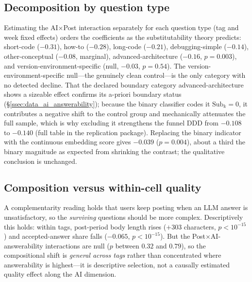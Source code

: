 \label{sec:mechanisms_body}

\subsection{Decomposition by question type}\label{ssec:mech_by_type}\label{ssec:mech_qtype_anomaly}

Estimating the AI$\times$Post interaction separately for each
question type (tag and week fixed effects) orders the
coefficients as the substitutability theory predicts:
short-code ($-0.31$), how-to ($-0.28$), long-code ($-0.21$),
debugging-simple ($-0.14$), other-conceptual ($-0.08$,
marginal), advanced-architecture ($-0.16$, $p=0.003$), and
version-environment-specific (null, $-0.03$, $p=0.54$). The
version-environment-specific null---the genuinely clean
control---is the only category with no detected decline. That
the declared boundary category advanced-architecture shows a
sizeable effect confirms its a-priori boundary status
(\S\ref{ssec:data_ai_answerability}); because the binary
classifier codes it $\text{Sub}_k=0$, it contributes a negative
shift to the control group and mechanically attenuates the full
sample, which is why excluding it strengthens the funnel DDD
from $-0.108$ to $-0.140$ (full table in the replication
package). Replacing the binary indicator with the continuous
embedding score gives $-0.039$ ($p=0.004$), about a third the
binary magnitude as expected from shrinking the contrast; the
qualitative conclusion is unchanged.

\subsection{Composition versus within-cell
quality}\label{ssec:mech_complementarity}\label{ssec:mech_resolvability}

A complementarity reading holds that users keep posting when an
LLM answer is unsatisfactory, so the \emph{surviving} questions
should be more complex. Descriptively this holds: within tags,
post-period body length rises ($+303$ characters, $p<10^{-15}$)
and accepted-answer share falls ($-0.065$, $p<10^{-15}$). But
the Post$\times$AI-answerability interactions are null
($p$ between $0.32$ and $0.79$), so the compositional shift is
\emph{general across tags} rather than concentrated where
answerability is highest---it is descriptive selection, not a
causally estimated quality effect along the AI dimension.

